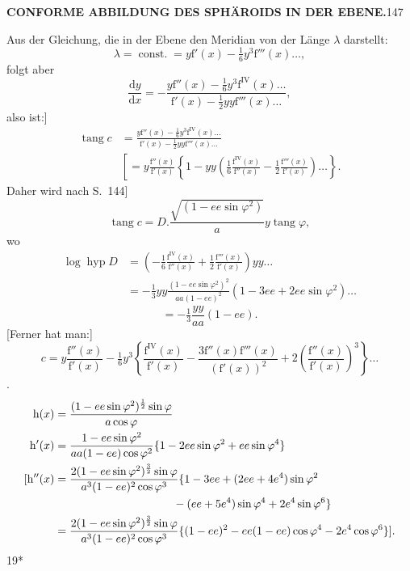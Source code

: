 \par\clearpage
\noindent\null\hfill{\small\textbf{CONFORME ABBILDUNG DES SPHÄROIDS IN DER EBENE.}}\hfill147\par\medskip
Aus der Gleichung, die in der Ebene den Meridian von der Länge \(\lambda\) darstellt:
\[\lambda=\operatorname{const.}=y\mathrm f'(x)-\tfrac16y^3\mathrm f'''(x)\ldots,\]
\noindent folgt aber
\[\frac{\mathrm dy}{\mathrm dx}=-\frac{y\mathrm f''(x)-\tfrac16y^3\mathrm f^{\mathrm{IV}}(x)\ldots}{\mathrm f'(x)-\tfrac12yy\mathrm f'''(x)\ldots},\]
\noindent also ist:]
\[
\begin{aligned}
\operatorname{tang}c&=\frac{y\mathrm f''(x)-\tfrac16y^3\mathrm f^{\mathrm{IV}}(x)\ldots}{\mathrm f'(x)-\tfrac12yy\mathrm f'''(x)\ldots}\\
&\left[=y\frac{\mathrm f''(x)}{\mathrm f'(x)}\left\{1-yy\left(\tfrac16\frac{\mathrm f^{\mathrm{IV}}(x)}{\mathrm f''(x)}-\tfrac12\frac{\mathrm f'''(x)}{\mathrm f'(x)}\right)\ldots\right\}. \right.
\end{aligned}
\]
Daher wird nach S.~144]
\[\operatorname{tang}c=D.\frac{\sqrt{(1-ee\sin\varphi^2)}}a y\operatorname{tang}\varphi,\]
\noindent wo
\[
\begin{aligned}
\log\operatorname{hyp}D&=\left(-\tfrac16\frac{\mathrm f^{\mathrm{IV}}(x)}{\mathrm f''(x)}+\tfrac12\frac{\mathrm f'''(x)}{\mathrm f'(x)}\right)yy\ldots\\
&=-\tfrac13yy\frac{(1-ee\sin\varphi^2)^2}{aa(1-ee)^2}(1-3ee+2ee\sin\varphi^2)\ldots
\end{aligned}
\]
\[=-\tfrac13\frac{yy}{aa}(1-ee).\]
[Ferner hat man:]
\[c=y\frac{\mathrm f''(x)}{\mathrm f'(x)}-\tfrac16y^3\left\{\frac{\mathrm f^{\mathrm{IV}}(x)}{\mathrm f'(x)}-\frac{3\mathrm f''(x)\mathrm f'''(x)}{(\mathrm f'(x))^2}+2\left(\frac{\mathrm f''(x)}{\mathrm f'(x)}\right)^3\right\}\ldots\]
.\]
\[
\begin{aligned}
\mathrm h(x)&=\frac{(1-ee\sin\varphi^2)^{\frac12}\sin\varphi}{a\cos\varphi}\\
\mathrm h'(x)&=\frac{1-ee\sin\varphi^2}{aa(1-ee)\cos\varphi^2}\{1-2ee\sin\varphi^2+ee\sin\varphi^4\}\\
{[}\mathrm h''(x)&=\frac{2(1-ee\sin\varphi^2)^{\frac32}\sin\varphi}{a^3(1-ee)^2\cos\varphi^3}\{1-3ee+(2ee+4e^4)\sin\varphi^2\\
&\hspace{37mm}-(ee+5e^4)\sin\varphi^4+2e^4\sin\varphi^6\}\\
&=\frac{2(1-ee\sin\varphi^2)^{\frac32}\sin\varphi}{a^3(1-ee)^2\cos\varphi^3}\{(1-ee)^2-ee(1-ee)\cos\varphi^4-2e^4\cos\varphi^6\}].
\end{aligned}
\]
\noindent\hfill{\small19*}\par

